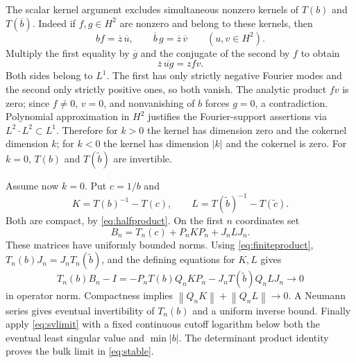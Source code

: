 \documentclass[11pt]{article}
\theoremstyle{definition}
\newcommand{\norm}[1]{\left\lVert #1\right\rVert}
\begin{document}
The scalar kernel argument excludes simultaneous nonzero kernels of $T(b)$ and $T(\overline b)$. Indeed if $f,g\in H^2$ are nonzero and belong to these kernels, then
\[
 bf=\overline z\,\overline u,\qquad
 \overline b\,g=\overline z\,\overline v\qquad(u,v\in H^2).
\]
Multiply the first equality by $\overline g$ and the conjugate of the second by $f$ to obtain
\[
 \overline z\,\overline{ug}=zfv.
\]
Both sides belong to $L^1$. The first has only strictly negative Fourier modes and the second only strictly positive ones, so both vanish. The analytic product $fv$ is zero; since $f\ne0$, $v=0$, and nonvanishing of $b$ forces $g=0$, a contradiction. Polynomial approximation in $H^2$ justifies the Fourier-support assertions via $L^2\cdot L^2\subset L^1$. Therefore for $k>0$ the kernel has dimension zero and the cokernel dimension $k$; for $k<0$ the kernel has dimension $|k|$ and the cokernel is zero. For $k=0$, $T(b)$ and $T(\widetilde b)$ are invertible.

Assume now $k=0$. Put $c=1/b$ and
\[
 K=T(b)^{-1}-T(c),\qquad L=T(\widetilde b)^{-1}-T(\widetilde c).
\]
Both are compact, by \eqref{eq:halfproduct}. On the first $n$ coordinates set
\[
 B_n=T_n(c)+P_nKP_n+J_nLJ_n.
\]
These matrices have uniformly bounded norms. Using \eqref{eq:finiteproduct}, $T_n(b)J_n=J_nT_n(\widetilde b)$, and the defining equations for $K,L$ gives
\[
 T_n(b)B_n-I=-P_nT(b)Q_nKP_n-J_nT(\widetilde b)Q_nLJ_n\longrightarrow0
\]
in operator norm. Compactness implies $\norm{Q_nK}+\norm{Q_nL}\to0$. A Neumann series gives eventual invertibility of $T_n(b)$ and a uniform inverse bound. Finally apply \eqref{eq:svlimit} with a fixed continuous cutoff logarithm below both the eventual least singular value and $\min|b|$. The determinant product identity proves the bulk limit in \eqref{eq:stable}.
\end{document}
